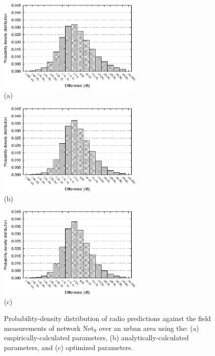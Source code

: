 \begin{figure}
\centering

\includegraphics[width=0.63\textwidth]{05-framework_parameter_tuning/img/urban-params_default}\\\hspace*{0.3in}(a)\vspace{5mm}

\includegraphics[width=0.63\textwidth]{05-framework_parameter_tuning/img/urban-params_fitted}\\\hspace*{0.3in}(b)\vspace{5mm}

\includegraphics[width=0.63\textwidth]{05-framework_parameter_tuning/img/urban-params_optim}\\\hspace*{0.3in}(c)\vspace{5mm}

\caption{Probability-density distribution of radio predictions against the
field measurements of network Net$_{9}$ over an urban area using
the: (a) empirically-calculated parameters, (b) analytically-calculated
parameters, and (c) optimized parameters.\label{fig:05-Error_distribution_for_Net9}}
\end{figure}


